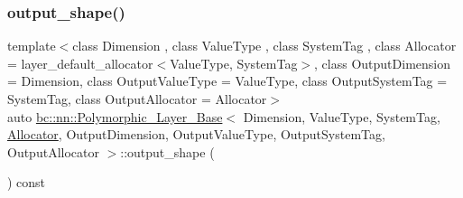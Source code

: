 \mbox{\label{structbc_1_1nn_1_1Polymorphic__Layer__Base_aa1e0b2c8f3de5576b73a27db6316b139}} 
\subsubsection{\texorpdfstring{output\+\_\+shape()}{output\_shape()}\hspace{0.1cm}{\footnotesize\ttfamily [1/2]}}
{\footnotesize\ttfamily template$<$class Dimension , class Value\+Type , class System\+Tag , class Allocator  = layer\+\_\+default\+\_\+allocator$<$\+Value\+Type, System\+Tag$>$, class Output\+Dimension  = Dimension, class Output\+Value\+Type  = Value\+Type, class Output\+System\+Tag  = System\+Tag, class Output\+Allocator  = Allocator$>$ \\
auto \hyperlink{structbc_1_1nn_1_1Polymorphic__Layer__Base}{bc\+::nn\+::\+Polymorphic\+\_\+\+Layer\+\_\+\+Base}$<$ Dimension, Value\+Type, System\+Tag, \hyperlink{classbc_1_1allocators_1_1Allocator}{Allocator}, Output\+Dimension, Output\+Value\+Type, Output\+System\+Tag, Output\+Allocator $>$\+::output\+\_\+shape (\begin{DoxyParamCaption}{ }\end{DoxyParamCaption}) const\hspace{0.3cm}{\ttfamily [inline]}}

\mbox{\label{structbc_1_1nn_1_1Polymorphic__Layer__Base_aa1e0b2c8f3de5576b73a27db6316b139}} 

